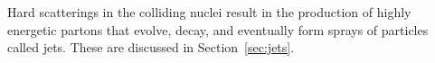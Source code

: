 

Hard scatterings in the colliding nuclei result in the production of highly energetic partons that evolve, decay, and eventually form sprays of particles called jets. These are discussed in Section~\ref{sec:jets}. 


